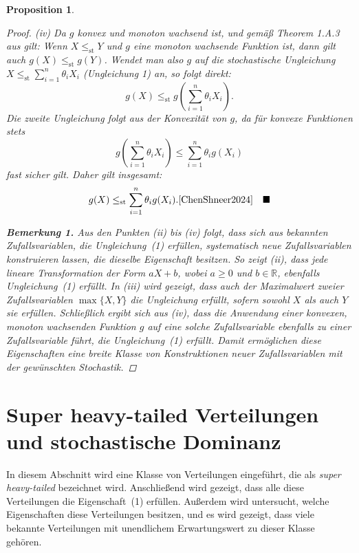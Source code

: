 \documentclass[
12pt,
fancyheadings, %
%
a4paper, 
%
]{tuhhreprt}
\newtheorem{proposition}[definition]{Proposition}
\begin{document}
\begin{proposition}
\begin{proof}
\textit{(iv)} Da \( g \) konvex und monoton wachsend ist, \textit{und gemäß Theorem 1.A.3 aus \cite{shaked2007stochastic} gilt: Wenn \( X \le_{\mathrm{st}} Y \) und \( g \) eine monoton wachsende Funktion ist, dann gilt auch \( g(X) \le_{\mathrm{st}} g(Y) \).} Wendet man also \( g \) auf die stochastische Ungleichung \( X \le_{\mathrm{st}} \sum_{i=1}^n \theta_i X_i \) (Ungleichung 1) an, so folgt direkt:
\[
g(X) \le_{\mathrm{st}} g\left(\sum_{i=1}^n \theta_i X_i\right).
\]
Die zweite Ungleichung folgt aus der Konvexität von \( g \), da für konvexe Funktionen stets
\[
g\left(\sum_{i=1}^n \theta_i X_i\right) \le \sum_{i=1}^n \theta_i g(X_i) 
\]
fast sicher gilt. Daher gilt insgesamt:
\[
g(X) \le_{\mathrm{st}} \sum_{i=1}^n \theta_i g(X_i). \cite{ChenShneer2024} \quad \blacksquare
\]





\vspace{1em}


\textbf{Bemerkung 1.} Aus den Punkten \textit{(ii)} bis \textit{(iv)} folgt, dass sich aus bekannten Zufallsvariablen, die Ungleichung~(1) erfüllen, systematisch neue Zufallsvariablen konstruieren lassen, die dieselbe Eigenschaft besitzen. So zeigt \textit{(ii)}, dass jede lineare Transformation der Form \( aX + b \), wobei \( a \geq 0 \) und \( b \in \mathbb{R} \), ebenfalls Ungleichung~(1) erfüllt. In \textit{(iii)} wird gezeigt, dass auch der Maximalwert zweier Zufallsvariablen \( \max\{X, Y\} \) die Ungleichung erfüllt, sofern sowohl \( X \) als auch \( Y \) sie erfüllen. Schließlich ergibt sich aus \textit{(iv)}, dass die Anwendung einer konvexen, monoton wachsenden Funktion \( g \) auf eine solche Zufallsvariable ebenfalls zu einer Zufallsvariable führt, die Ungleichung~(1) erfüllt. Damit ermöglichen diese Eigenschaften eine breite Klasse von Konstruktionen neuer Zufallsvariablen mit der gewünschten Stochastik.\cite{ChenShneer2024}


\end{proof}
\end{proposition}





\chapter{Super heavy-tailed Verteilungen und stochastische Dominanz}

In diesem Abschnitt wird eine Klasse von Verteilungen eingeführt, die als \textit{super heavy-tailed} bezeichnet wird. Anschließend wird gezeigt, dass alle diese Verteilungen die Eigenschaft~(1) erfüllen. Außerdem wird untersucht, welche Eigenschaften diese Verteilungen besitzen, und es wird gezeigt, dass viele bekannte Verteilungen mit unendlichem Erwartungswert zu dieser Klasse gehören.
\end{document}
